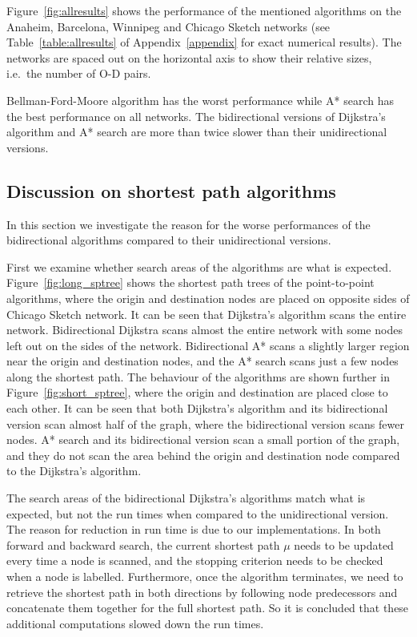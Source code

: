 Figure~\ref{fig:allresults} shows the performance of the mentioned algorithms on the Anaheim, Barcelona, Winnipeg and Chicago Sketch networks
(see Table~\ref{table:allresults} of Appendix~\ref{appendix} for exact numerical results).
The networks are spaced out on the horizontal axis to show their relative sizes, i.e.\ the number of O-D pairs.

Bellman-Ford-Moore algorithm has the worst performance while A* search has the best performance on all networks.
The bidirectional versions of Dijkstra's algorithm and A* search are more than twice slower than their unidirectional versions.

\subsection{Discussion on shortest path algorithms}
In this section we investigate the reason for the worse performances of the bidirectional algorithms compared to their unidirectional versions. 

First we examine whether search areas of the algorithms are what is expected.
Figure~\ref{fig:long_sptree} shows the shortest path trees of the point-to-point algorithms, 
where the origin and destination nodes are placed on opposite sides of Chicago Sketch network.
It can be seen that Dijkstra's algorithm scans the entire network.
Bidirectional Dijkstra scans almost the entire network with some nodes left out on the sides of the network.
Bidirectional A* scans a slightly larger region near the origin and destination nodes,
and the A* search scans just a few nodes along the shortest path.
The behaviour of the algorithms are shown further in Figure~\ref{fig:short_sptree},
where the origin and destination are placed close to each other.
It can be seen that both Dijkstra's algorithm and its bidirectional version scan almost half of the graph,
where the bidirectional version scans fewer nodes.
A* search and its bidirectional version scan a small portion of the graph,
and they do not scan the area behind the origin and destination node compared to the Dijkstra's algorithm.

The search areas of the bidirectional Dijkstra's algorithms match what is expected,
but not the run times when compared to the unidirectional version.
The reason for reduction in run time is due to our implementations.
In both forward and backward search,
the current shortest path $\mu$ needs to be updated every time a node is scanned,
and the stopping criterion needs to be checked when a node is labelled.
Furthermore,
once the algorithm terminates,
we need to retrieve the shortest path in both directions by following node predecessors and concatenate them together for the full shortest path.
So it is concluded that these additional computations slowed down the run times.

